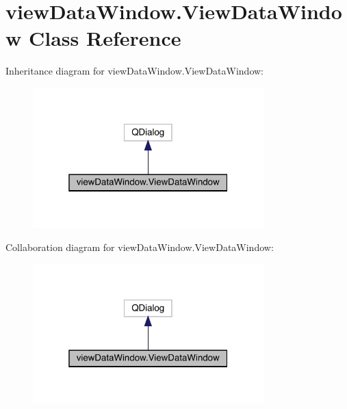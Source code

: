 \hypertarget{classview_data_window_1_1_view_data_window}{}\section{view\+Data\+Window.\+View\+Data\+Window Class Reference}
\label{classview_data_window_1_1_view_data_window}


Inheritance diagram for view\+Data\+Window.\+View\+Data\+Window\+:\nopagebreak
\begin{figure}[H]
\begin{center}
\leavevmode
\includegraphics[width=253pt]{classview_data_window_1_1_view_data_window__inherit__graph}
\end{center}
\end{figure}


Collaboration diagram for view\+Data\+Window.\+View\+Data\+Window\+:\nopagebreak
\begin{figure}[H]
\begin{center}
\leavevmode
\includegraphics[width=253pt]{classview_data_window_1_1_view_data_window__coll__graph}
\end{center}
\end{figure}

